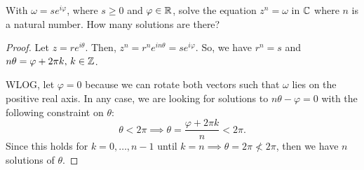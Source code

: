 \documentclass[../hw1]{subfiles}
\begin{document}
\begin{problem}
With $\omega = se^{i\varphi}$, where $s\ge 0$ and $\varphi \in \mathbb{R}$, solve the equation $z^n = \omega$ in $\mathbb{C}$ where $n$ is a natural number.
How many solutions are there?
\end{problem}
\begin{proof}
	Let $z=re^{i\theta}$.
	Then, $z^n = r^n e^{in\theta} = se^{i\varphi}$.
	So, we have $r^n = s$ and  $n\theta = \varphi+2\pi k,\, k\in \mathbb{Z}$.

	WLOG, let $\varphi=0$ because we can rotate both vectors such that  $\omega$ lies on the positive real axis.
	In any case, we are looking for solutions to $n\theta-\varphi=0$ with the following constraint on $\theta$: \[
		\theta < 2\pi \implies \theta = \frac{\varphi+2\pi k}{n}<2\pi
		.\]
	Since this holds for $k=0,\ldots,n-1$ until $k=n \implies \theta = 2\pi \not< 2\pi$, then we have $n$ solutions of $\theta$.
\end{proof}
\end{document}

